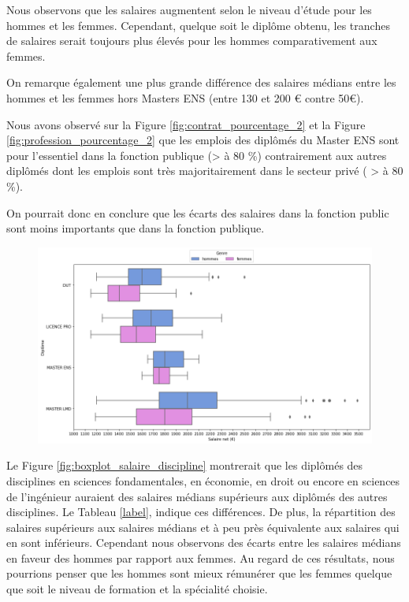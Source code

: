 \documentclass[12pt, a4paper, titlepage, table]{article}
\begin{document}
	Nous observons que les salaires augmentent selon le niveau d'étude pour les hommes et les femmes. Cependant, quelque soit le diplôme obtenu, les tranches de salaires serait toujours plus élevés pour les hommes comparativement aux femmes.
	
	On remarque également une plus grande différence des salaires médians entre les hommes et les femmes hors Masters ENS (entre 130 et 200 € contre 50€). 
	
	Nous avons observé sur la Figure \ref{fig:contrat_pourcentage_2} et la Figure \ref{fig:profession_pourcentage_2} que les emplois des diplômés du Master ENS sont pour l'essentiel dans la fonction publique (> à 80 \%) contrairement aux autres diplômés dont les emplois sont très majoritairement dans le secteur privé ( >  à 80 \%).
	
	On pourrait donc en conclure que les écarts des salaires dans la fonction public sont moins importants que dans la fonction publique.
	

	\begin{figure}[H]
		\centering
		\includegraphics[width=1\textwidth]{../graphs/boxplot_diplomes_genre.png}
		\label{fig:boxplot_diplome_genre}
	\end{figure}

	Le Figure \ref{fig:boxplot_salaire_discipline} montrerait que les diplômés des disciplines en sciences fondamentales, en économie, en droit ou encore en sciences de l'ingénieur auraient des salaires médians supérieurs aux diplômés des autres disciplines. Le Tableau \ref{label}, indique ces différences. De plus, la répartition des salaires supérieurs aux salaires médians et à peu près équivalente aux salaires qui en sont inférieurs. Cependant nous observons des écarts entre les salaires médians en faveur des hommes par rapport aux femmes.
	Au regard de ces résultats, nous pourrions penser que les hommes sont mieux rémunérer que les femmes quelque que soit le niveau de formation et la spécialité choisie. 
\end{document}
